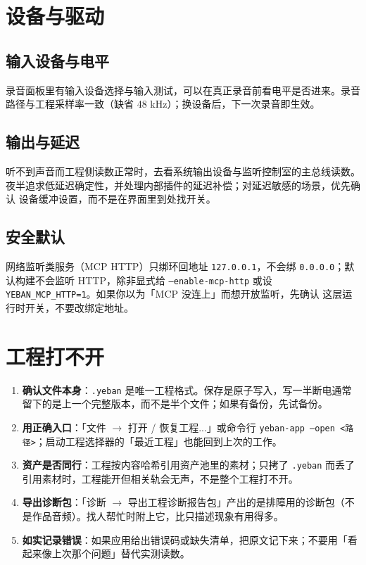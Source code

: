 
\section{设备与驱动}

\subsection{输入设备与电平}

录音面板里有输入设备选择与输入测试，可以在真正录音前看电平是否进来。录音
路径与工程采样率一致（缺省 48 kHz）；换设备后，下一次录音即生效。

\subsection{输出与延迟}

听不到声音而工程侧读数正常时，去看系统输出设备与监听控制室的主总线读数。
夜半追求低延迟确定性，并处理内部插件的延迟补偿；对延迟敏感的场景，优先确认
设备缓冲设置，而不是在界面里到处找开关。

\subsection{安全默认}

网络监听类服务（MCP HTTP）只绑环回地址 \texttt{127.0.0.1}，不会绑
\texttt{0.0.0.0}；默认构建不会监听 HTTP，除非显式给 \texttt{--enable-mcp-http}
或设 \texttt{YEBAN\_MCP\_HTTP=1}。如果你以为「MCP 没连上」而想开放监听，先确认
这层运行时开关，不要改绑定地址。

\section{工程打不开}

\begin{enumerate}
  \item \textbf{确认文件本身}：\texttt{.yeban} 是唯一工程格式。保存是原子写入，写一半断电通常留下的是上一个完整版本，而不是半个文件；如果有备份，先试备份。
  \item \textbf{用正确入口}：「文件 $\to$ 打开 / 恢复工程...」或命令行 \texttt{yeban-app --open <路径>}；启动工程选择器的「最近工程」也能回到上次的工作。
  \item \textbf{资产是否同行}：工程按内容哈希引用资产池里的素材；只拷了 \texttt{.yeban} 而丢了引用素材时，工程能开但相关轨会无声，不是整个工程打不开。
  \item \textbf{导出诊断包}：「诊断 $\to$ 导出工程诊断报告包」产出的是排障用的诊断包（不是作品音频）。找人帮忙时附上它，比只描述现象有用得多。
  \item \textbf{如实记录错误}：如果应用给出错误码或缺失清单，把原文记下来；不要用「看起来像上次那个问题」替代实测读数。
\end{enumerate}

